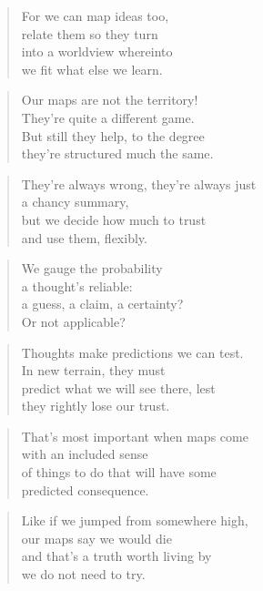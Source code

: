 \documentclass[14pt,a4paper]{article}
\begin{document}
\begin{verse}
For we can map ideas too,\\
relate them so they turn\\
into a worldview whereinto\\
we fit what else we learn.
\end{verse}

\begin{verse}
Our maps are not the territory!\\
They’re quite a different game.\\
But still they help, to the degree\\
they’re structured much the same.
\end{verse}

\begin{verse}
They’re always wrong, they’re always just\\
a chancy summary,\\
but we decide how much to trust\\
and use them, flexibly.
\end{verse}

\begin{verse}
We gauge the probability\\
a thought’s reliable:\\
a guess, a claim, a certainty?\\
Or not applicable?
\end{verse}

\begin{verse}
Thoughts make predictions we can test.\\
In new terrain, they must\\
predict what we will see there, lest\\
they rightly lose our trust.
\end{verse}

\begin{verse}
That’s most important when maps come\\
with an included sense\\
of things to do that will have some\\
predicted consequence.
\end{verse}

\begin{verse}
Like if we jumped from somewhere high,\\
our maps say we would die\\
and that’s a truth worth living by\\
we do not need to try.
\end{verse}
\end{document}
